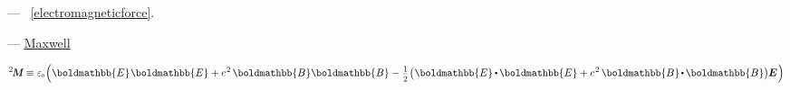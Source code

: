 \vspace{-0.1em} \noindent --- ~\eqref{electromagneticforce}.


 \:---  \href{https://en.wikipedia.org/wiki/Maxwell_stress_tensor}{Maxwell}

\nopagebreak\vspace{-0.1em}\begin{equation}\label{maxwellstresstensor:definition}
\maxwellstress \equiv
\vacuumpermittivity \hspace{-0.25ex} \left(
\boldmathbb{E} \hspace{.1ex} \boldmathbb{E} + c^{\hspace{.16ex}2} \hspace{.3ex} \boldmathbb{B} \boldmathbb{B}
- \hspace{.1ex} \smalldisplaystyleonehalf \hspace{.1ex} \bigl( \hspace{.1ex} \boldmathbb{E} \hspace{-0.1ex} \dotp \hspace{-0.15ex} \boldmathbb{E} + c^{\hspace{.16ex}2} \hspace{.3ex} \boldmathbb{B} \hspace{-0.2ex} \dotp \hspace{-0.16ex} \boldmathbb{B} \bigr) \hspace{-0.06ex} \bm{E} \hspace{.1ex}
\right)
\end{equation}

